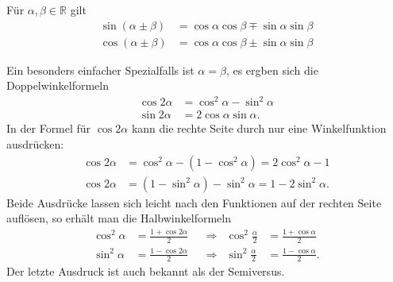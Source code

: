 \begin{satz}
%
Für $\alpha,\beta\in\mathbb{R}$ gilt
\begin{align*}
\sin(\alpha\pm\beta)
&=
\cos\alpha\cos\beta\mp\sin\alpha\sin\beta
\\
\cos(\alpha\pm\beta)
&=
\cos\alpha\cos\beta\pm\sin\alpha\sin\beta
\end{align*}
\end{satz}

Ein besonders einfacher Spezialfalls ist $\alpha=\beta$, es ergben sich die
Doppelwinkelformeln
\begin{align*}
\cos2\alpha &= \cos^2\alpha-\sin^2\alpha
\\
\sin2\alpha &= 2\cos\alpha\sin\alpha.
\end{align*}
In der Formel für $\cos2\alpha$ kann die rechte Seite durch nur
eine Winkelfunktion ausdrücken:
\begin{align*}
\cos2\alpha &= \cos^2\alpha - (1-\cos^2\alpha) = 2\cos^2\alpha -1
\\
\cos2\alpha &= (1-\sin^2\alpha) - \sin^2\alpha = 1-2\sin^2\alpha.
\end{align*}
Beide Ausdrücke lassen sich leicht nach den Funktionen auf der rechten
Seite auflösen, so erhält man die Halbwinkelformeln
\begin{align*}
\cos^2\alpha &= \frac{1+\cos2\alpha}2
&&\Rightarrow&
\cos^2\frac{\alpha}2 &=\frac{1+\cos\alpha}2
\\
\sin^2\alpha &= \frac{1-\cos2\alpha}2
&&\Rightarrow&
\sin^2\frac{\alpha}2 &= \frac{1-\cos\alpha}2.
\end{align*}
Der letzte Ausdruck ist auch bekannt als der Semiversus.

